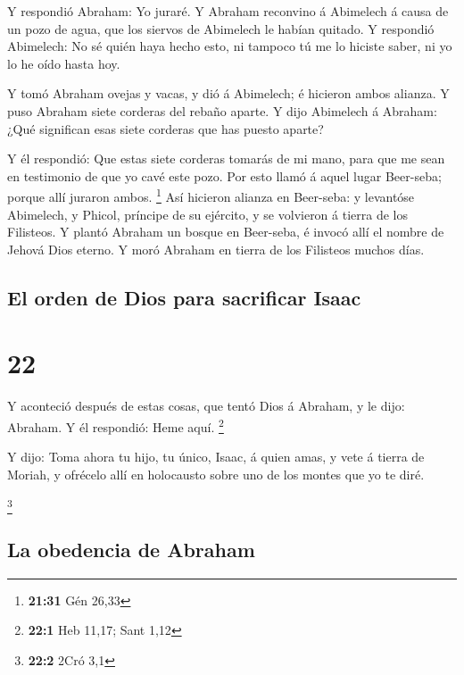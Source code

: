  Y respondió Abraham: Yo juraré.  Y
Abraham reconvino á Abimelech á causa de un pozo de agua, que los
siervos de Abimelech le habían quitado.  Y respondió
Abimelech: No sé quién haya hecho esto, ni tampoco tú me lo hiciste
saber, ni yo lo he oído hasta hoy.

 Y tomó Abraham ovejas y vacas, y dió á Abimelech; é
hicieron ambos alianza.  Y puso Abraham siete corderas
del rebaño aparte.  Y dijo Abimelech á Abraham: ¿Qué
significan esas siete corderas que has puesto aparte?

 Y él respondió: Que estas siete corderas tomarás de mi
mano, para que me sean en testimonio de que yo cavé este pozo.
 Por esto llamó á aquel lugar Beer-seba; porque allí
juraron ambos. \footnote{\textbf{21:31} Gén 26,33}  Así
hicieron alianza en Beer-seba: y levantóse Abimelech, y Phicol, príncipe
de su ejército, y se volvieron á tierra de los Filisteos.
 Y plantó Abraham un bosque en Beer-seba, é invocó allí
el nombre de Jehová Dios eterno.  Y moró Abraham en
tierra de los Filisteos muchos días.

\hypertarget{el-orden-de-dios-para-sacrificar-isaac}{%
\subsection{El orden de Dios para sacrificar
Isaac}\label{el-orden-de-dios-para-sacrificar-isaac}}

\hypertarget{section-21}{%
\section{22}\label{section-21}}

 Y aconteció después de estas cosas, que tentó Dios á
Abraham, y le dijo: Abraham. Y él respondió: Heme aquí. \footnote{\textbf{22:1}
  Heb 11,17; Sant 1,12}

 Y dijo: Toma ahora tu hijo, tu único, Isaac, á quien
amas, y vete á tierra de Moriah, y ofrécelo allí en holocausto sobre uno
de los montes que yo te diré.

\footnote{\textbf{22:2} 2Cró 3,1}

\hypertarget{la-obedencia-de-abraham}{%
\subsection{La obedencia de Abraham}\label{la-obedencia-de-abraham}}

